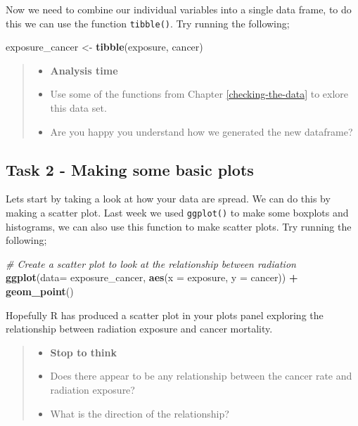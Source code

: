 \documentclass[
]{book}
\newenvironment{Shaded}{\begin{snugshade}}{\end{snugshade}}
\newcommand{\AttributeTok}[1]{\textcolor[rgb]{0.13,0.29,0.53}{#1}}
\newcommand{\CommentTok}[1]{\textcolor[rgb]{0.56,0.35,0.01}{\textit{#1}}}
\newcommand{\FunctionTok}[1]{\textcolor[rgb]{0.13,0.29,0.53}{\textbf{#1}}}
\newcommand{\NormalTok}[1]{#1}
\newcommand{\OtherTok}[1]{\textcolor[rgb]{0.56,0.35,0.01}{#1}}
\newcommand{\SpecialCharTok}[1]{\textcolor[rgb]{0.81,0.36,0.00}{\textbf{#1}}}
\providecommand{\tightlist}{%
  \setlength{\itemsep}{0pt}\setlength{\parskip}{0pt}}
\begin{document}
Now we need to combine our individual variables into a single data frame, to do this we can use the function \texttt{tibble()}. Try running the following;

\begin{Shaded}
\begin{Highlighting}[]
\NormalTok{exposure\_cancer }\OtherTok{\textless{}{-}} \FunctionTok{tibble}\NormalTok{(exposure, cancer)}
\end{Highlighting}
\end{Shaded}

\begin{quote}
\begin{itemize}
\tightlist
\item
  \textbf{Analysis time}
\item
  Use some of the functions from Chapter \ref{checking-the-data} to exlore this data set.
\item
  Are you happy you understand how we generated the new dataframe?
\end{itemize}
\end{quote}

\subsection{Task 2 - Making some basic plots}\label{c6t2}

Lets start by taking a look at how your data are spread. We can do this by making a scatter plot. Last week we used \texttt{ggplot()} to make some boxplots and histograms, we can also use this function to make scatter plots. Try running the following;

\begin{Shaded}
\begin{Highlighting}[]
\CommentTok{\# Create a scatter plot to look at the relationship between radiation }
\FunctionTok{ggplot}\NormalTok{(}\AttributeTok{data=}\NormalTok{ exposure\_cancer, }\FunctionTok{aes}\NormalTok{(}\AttributeTok{x =}\NormalTok{ exposure, }\AttributeTok{y =}\NormalTok{ cancer)) }\SpecialCharTok{+}
  \FunctionTok{geom\_point}\NormalTok{()}
\end{Highlighting}
\end{Shaded}

Hopefully R has produced a scatter plot in your plots panel exploring the relationship between radiation exposure and cancer mortality.

\begin{quote}
\begin{itemize}
\tightlist
\item
  \textbf{Stop to think}
\item
  Does there appear to be any relationship between the cancer rate and radiation exposure?
\item
  What is the direction of the relationship?
\end{itemize}
\end{quote}
\end{document}
